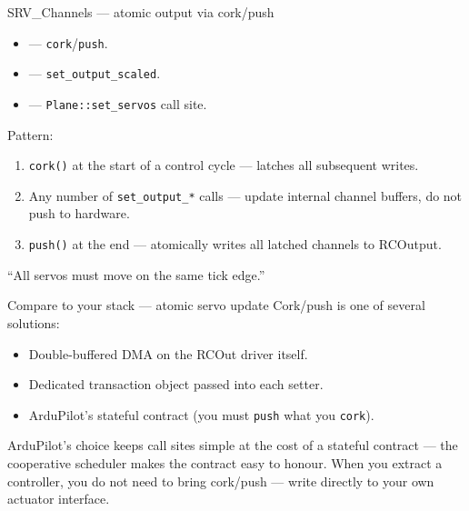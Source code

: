 \documentclass[aspectratio=169,11pt]{beamer}
\begin{document}
\begin{frame}{SRV\_Channels --- atomic output via cork/push}
  \begin{itemize}
    \item {} --- \texttt{cork}/\texttt{push}.
    \item {} --- \texttt{set\_output\_scaled}.
    \item {} --- \texttt{Plane::set\_servos} call site.
  \end{itemize}
  \vfill
  Pattern:
  \begin{enumerate}
    \item \texttt{cork()} at the start of a control cycle --- latches all subsequent writes.
    \item Any number of \texttt{set\_output\_*} calls --- update internal channel buffers, do not push to hardware.
    \item \texttt{push()} at the end --- atomically writes all latched channels to RCOutput.
  \end{enumerate}
  \vfill
  ``All servos must move on the same tick edge.''
\end{frame}

\begin{frame}{Compare to your stack --- atomic servo update}
  Cork/push is one of several solutions:
  \begin{itemize}
    \item Double-buffered DMA on the RCOut driver itself.
    \item Dedicated transaction object passed into each setter.
    \item ArduPilot's stateful contract (you must \texttt{push} what you \texttt{cork}).
  \end{itemize}
  \vfill
  ArduPilot's choice keeps call sites simple at the cost of a stateful contract --- the cooperative scheduler makes the contract easy to honour.
  \vfill
  When you extract a controller, you do not need to bring cork/push --- write directly to your own actuator interface.
\end{frame}
\end{document}
